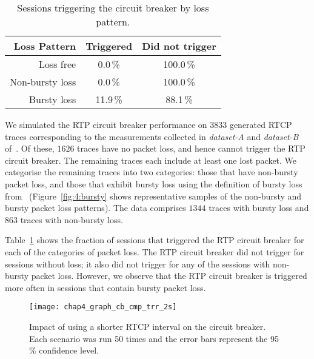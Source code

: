 \begin{table}
  \begin{center}
    \begin{tabular}{rcc}
    \toprule
      \textbf{Loss Pattern}   & \textbf{Triggered} & \textbf{Did not trigger} \\
    \midrule
             Loss free &   0.0\,\% & 100.0\,\% \\
       Non-bursty loss &   0.0\,\% & 100.0\,\% \\
          Bursty loss  &  11.9\,\% &  88.1\,\% \\
    \bottomrule
    \end{tabular}
    \caption{Sessions triggering the circuit breaker by loss pattern.}
    \label{tab:4:cb_bursty}
  \end{center}
\end{table}

We simulated the RTP circuit breaker performance on $3833$ generated RTCP traces
corresponding to the measurements collected in \emph{dataset-A} and
\emph{dataset-B} of~\cite{ellis:2011:dataset}. Of these, $1626$ traces have no
packet loss, and hence cannot trigger the RTP circuit breaker. The remaining
traces each include at least one lost packet. We categorise the remaining
traces into two categories: those that have non-bursty packet loss, and those
that exhibit bursty loss using the definition of bursty loss
from~\cite{rfc3611} (Figure~\ref{fig:4:bursty} shows representative samples of
the non-bursty and bursty packet loss patterns). The data comprises $1344$
traces with bursty loss and $863$ traces with non-bursty loss.



Table~\ref{tab:4:cb_bursty} shows the fraction of sessions that triggered the
RTP circuit breaker for each of the categories of packet loss. The RTP circuit
breaker did not trigger for sessions without loss; it also did not trigger for
any of the sessions with non-bursty packet loss. However, we observe that the
RTP circuit breaker is triggered more often in sessions that contain bursty
packet loss.

\begin{figure}[!t]
  \centerline{
    {\texttt{[image: chap4\_graph\_cb\_cmp\_trr\_2s]}}
  }
  \caption{Impact of using a shorter RTCP interval on the
  circuit breaker. Each scenario was run 50 times and the error bars represent
  the 95\,\% confidence level.}
  \label{fig:4:short-rtcp}
\end{figure}

